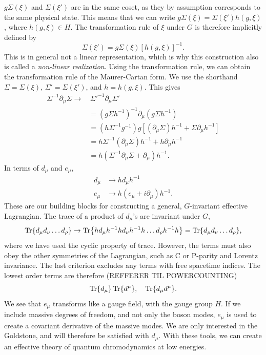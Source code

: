 $g\Sigma(\xi)$ and $\Sigma(\xi')$ are in the same coset, as they by assumption corresponds to the same physical state.
This means that we can write $g\Sigma(\xi) = \Sigma(\xi') h(g, \xi)$, where $h(g, \xi) \in H$.
The transformation rule of $\xi$ under $G$ is therefore implicitly defined by
\begin{equation}
    \Sigma(\xi') = g \Sigma(\xi) [h(g, \xi)]^{-1}.
\end{equation}
This is in general not a linear representation, which is why this construction also is called a \emph{non-linear realization}.
Using the transformation rule, we can obtain the transformation rule of the Maurer-Cartan form.
We use the shorthand $\Sigma = \Sigma(\xi),\, \Sigma' = \Sigma(\xi')$, and $h = h(g, \xi)$.
This gives
\begin{align*}
    \Sigma^{-1} \partial_\mu \Sigma
    \rightarrow 
    & \, \Sigma'^{-1} \partial_\mu \Sigma' \\
    & = (g \Sigma h^{-1})^{-1} \partial_\mu (g \Sigma h^{-1}) \\
    & = (h \Sigma^{-1} g^{-1}) g [(\partial_\mu \Sigma)h^{-1} + \Sigma \partial_\mu h^{-1}] \\
    & = h \Sigma^{-1} (\partial_\mu \Sigma) h^{-1}
    + h \partial_\mu h^{-1} \\
    & = h (\Sigma^{-1} \partial_\mu \Sigma + \partial_\mu) h^{-1}.
\end{align*}
In terms of $d_\mu$ and $e_\mu$,
\begin{align}
    d_\mu & \rightarrow h d_\mu h^{-1} \\
    e_\mu & \rightarrow h (e_\mu + i\partial_\mu )h^{-1}.
\end{align}
These are our building blocks for constructing a general, $G$-invariant effective Lagrangian.
The trace of a product of $d_\mu$'s are invariant under $G$,
\begin{equation}
    \Tr{d_\mu d_\nu \dots d_\rho} 
    \rightarrow
    \Tr{h d_\mu h^{-1} h d_\nu h^{-1} h \dots d_\rho h^{-1} h}
    = \Tr{d_\mu d_\nu \dots d_\rho},
\end{equation}
where we have used the cyclic property of trace.
However, the terms must also obey the other symmetries of the Lagrangian, such as C or P-parity and Lorentz invariance.
The last criterion excludes any terms with free spacetime indices.
The lowest order terms are therefore (REFFERER TIL POWERCOUNTING)
\begin{equation}
    \Tr{d_\mu} \Tr{d^\mu}, 
    \quad 
    \Tr{d_\mu d^\mu}.
\end{equation}
We see that $e_\mu$ transforms like a gauge field, with the gauge group $H$.
If we include massive degrees of freedom, and not only the boson modes, $e_\mu$ is used to create a covariant derivative of the massive modes.
We are only interested in the Goldstone, and will therefore be satisfied with $d_\mu$.
With these tools, we can create an effective theory of quantum chromodynamics at low energies.

